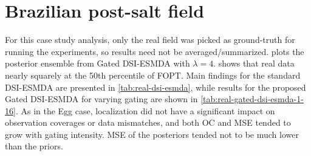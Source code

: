 \section{Brazilian post-salt field}
\label{sec:results-real-field}

For this case study analysis, only the real field was picked as ground-truth 
for running the experiments,
so results need not be averaged/summarized.
%
 plots the posterior ensemble from Gated DSI-ESMDA with $\lambda=4$.
%
 shows that real data
nearly squarely at the 50th percentile of FOPT.
%
Main findings for the standard DSI-ESMDA are presented in \cref{tab:real-dsi-esmda},
while results for the proposed Gated DSI-ESMDA for varying gating are shown in 
\cref{tab:real-gated-dsi-esmda-1-16}.
%
As in the Egg case,
localization did not have a significant impact on observation coverages or data mismatches,
and both OC and MSE tended to grow with gating intensity.
%
MSE of the posteriors tended not to be much lower than the priors.

\noindent
\begin{minipage}{0.4\linewidth}
    \centering
    \label{fig:fopt-real} 
    
\end{minipage}
%
\begin{minipage}{0.59\linewidth}
    \centering
    \label{tab:real-dsi-esmda}
    \ABNTEXfontereduzida
    
\end{minipage}

\begin{table}[htbp]
    \centering
\end{table}
